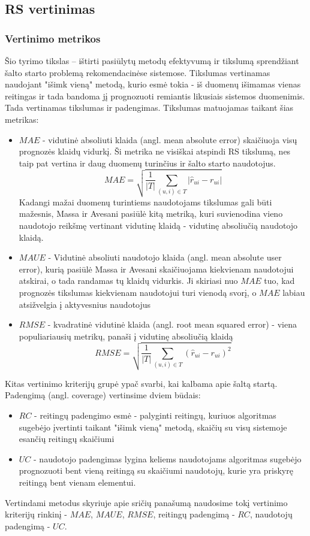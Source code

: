 \documentclass{VUMIFInfMagistrinis}
\begin{document}
\subsection{RS vertinimas}
\subsubsection{Vertinimo metrikos}
\indent
Šio tyrimo tikslas – ištirti pasiūlytų metodų efektyvumą ir tikslumą sprendžiant šalto starto problemą rekomendacinėse sistemose. Tikslumas vertinamas naudojant "išimk vieną" metodą, kurio esmė tokia - iš duomenų išimamas vienas reitingas ir tada bandoma jį prognozuoti remiantis likusiais sistemos duomenimis. Tada vertinamas tikslumas ir padengimas. Tikslumas matuojamas taikant šias metrikas:
\begin{itemize}
	\item $MAE$ - vidutinė absoliuti klaida (angl. mean absolute error) skaičiuoja visų prognozės klaidų vidurkį. Ši metrika ne visiškai atspindi RS tikslumą, nes taip pat vertina ir daug duomenų turinčius ir šalto starto naudotojus.
	\begin{equation}
	MAE = \sqrt{\frac{1}{|T|}\sum\limits_{(u,i)\in T} |\hat{r}_{ui} - r_{ui}|}
	\end{equation}
	Kadangi mažai duomenų turintiems naudotojams tikslumas gali būti mažesnis, Massa ir Avesani pasiūlė kitą metriką, kuri suvienodina vieno naudotojo reikšmę vertinant vidutinę klaidą - vidutinę absoliučią naudotojo klaidą.
	\item $MAUE$ - Vidutinė absoliuti naudotojo klaida (angl. mean absolute user error), kurią pasiūlė Massa ir Avesani skaičiuojama kiekvienam naudotojui atskirai, o tada randamas tų klaidų vidurkis. Ji skiriasi nuo $MAE$ tuo, kad prognozės tikslumas kiekvienam naudotojui turi vienodą svorį, o $MAE$ labiau atsižvelgia į aktyvesnius naudotojus
	\item $RMSE$ - kvadratinė vidutinė klaida (angl. root mean squared error) - viena populiariausių metrikų, panaši į vidutinę absoliučią klaidą
	\begin{equation}
	RMSE = \sqrt{\frac{1}{|T|}\sum\limits_{(u,i)\in T} (\hat{r}_{ui} - r_{ui})^2}
	\end{equation}
\end{itemize}
Kitas vertinimo kriterijų grupė ypač svarbi, kai kalbama apie šaltą startą. Padengimą (angl. coverage) vertinsime dviem būdais:

\begin{itemize}
	\item $RC$ - reitingų padengimo esmė - palyginti reitingų, kuriuos algoritmas sugebėjo įvertinti taikant "išimk vieną" metodą, skaičių su visų sistemoje esančių reitingų skaičiumi
	\item $UC$ - naudotojo padengimas lygina keliems naudotojams algoritmas sugebėjo prognozuoti bent vieną reitingą su skaičiumi naudotojų, kurie yra priskyrę reitingą bent vienam elementui.
\end{itemize}
Vertindami metodus skyriuje apie sričių panašumą naudosime tokį vertinimo kriterijų rinkinį - $MAE$, $MAUE$, $RMSE$, reitingų padengimą - $RC$, naudotojų padengimą - $UC$.
\end{document}
